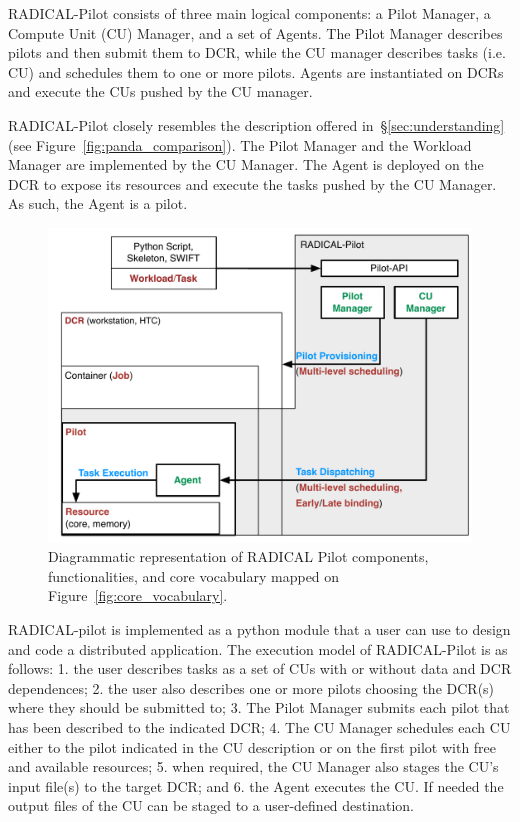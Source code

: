 \documentclass{sig-alternate}
\begin{document}
RADICAL-Pilot consists of three main logical components: a Pilot Manager, a
Compute Unit (CU) Manager, and a set of Agents. The Pilot Manager describes
pilots and then submit them to DCR, while the CU manager describes tasks (i.e.
CU) and schedules them to one or more pilots. Agents are instantiated on DCRs
and execute the CUs pushed by the CU manager.

RADICAL-Pilot
closely resembles the description offered
in~\S\ref{sec:understanding} (see Figure~\ref{fig:panda_comparison}). The Pilot
Manager and the Workload Manager are implemented by the CU Manager. The Agent is
deployed on the DCR to expose its resources and execute the tasks pushed by the
CU Manager. As such, the Agent is a pilot.

\begin{figure}[t]
    \centering
        \includegraphics[width=.48\textwidth]{figures/radicalp_comparison.pdf}
    \caption{Diagrammatic representation of RADICAL Pilot components,
    functionalities, and core vocabulary mapped on
    Figure~\ref{fig:core_vocabulary}.}
    \label{fig:rp_comparison}
\end{figure}

RADICAL-pilot is implemented as a python module that a user can use to design
and code a distributed application. The execution model of RADICAL-Pilot is as
follows: 1. the user describes tasks as a set of CUs with or without data and
DCR dependences; 2. the user also describes one or more pilots choosing the
DCR(s) where they should be submitted to; 3. The Pilot Manager submits each
pilot that has been described to the indicated DCR; 4. The CU Manager schedules
each CU either to the pilot indicated in the CU description or on the first
pilot with free and available resources; 5. when required, the CU Manager also
stages the CU's input file(s) to the target DCR; and 6. the Agent executes the
CU.  If needed the output files of the CU can be staged to a
user-defined destination.
\end{document}
